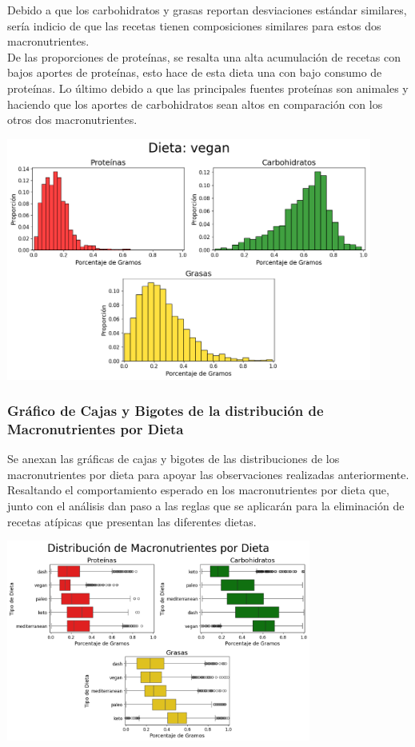 \documentclass[12pt,a4paper]{article}
\begin{document}
            Debido a que los carbohidratos y grasas reportan desviaciones estándar 
            similares, sería indicio de que las recetas tienen composiciones similares 
            para estos dos macronutrientes.\\

            De las proporciones de proteínas, se resalta una alta acumulación de 
            recetas con bajos aportes de proteínas, esto hace de esta dieta una 
            con bajo consumo de proteínas. Lo último debido a que las principales 
            fuentes proteínas son animales y haciendo que los aportes de carbohidratos 
            sean altos en comparación con los otros dos macronutrientes.

            \begin{center}
                \includegraphics[width=0.90\textwidth]{Resources/2_03_plot_05.png}
            \end{center}

        \subsubsection{Gráfico de Cajas y Bigotes de la distribución de Macronutrientes por Dieta}
            Se anexan las gráficas de cajas y bigotes de las distribuciones de los 
            macronutrientes por dieta para apoyar las observaciones realizadas anteriormente. 
            Resaltando el comportamiento esperado en los macronutrientes por dieta que, junto 
            con el análisis dan paso a las reglas que se aplicarán para la eliminación de recetas 
            atípicas que presentan las diferentes dietas.

            \begin{center}
                \includegraphics[width=0.75\textwidth]{Resources/2_03_plot_06.png}
            \end{center}

\newpage

\printbibliography[heading=bibintoc,title={Referencias Bibliográficas}]
\end{document}
